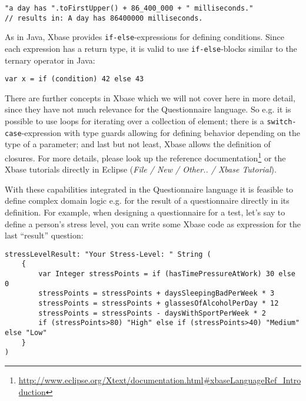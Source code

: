 \begin{lstlisting}[language=Xbase]
"a day has ".toFirstUpper() + 86_400_000 + " milliseconds."
// results in: A day has 86400000 milliseconds.
\end{lstlisting}

As in Java, Xbase provides \texttt{if-else}-expressions for defining conditions. Since each expression
has a return type, it is valid to use  \texttt{if-else}-blocks similar to the ternary operator in Java:

\begin{lstlisting}[language=Xbase]
var x = if (condition) 42 else 43
\end{lstlisting}

There are further concepts in Xbase which we will not cover here in more detail, since they have
not much relevance for the Questionnaire language. So e.g. it is possible to use loops for
iterating over a collection of element; there is a \texttt{switch-case}-expression
with type guards allowing for defining behavior depending on the type of a parameter; and last but
not least, Xbase allows the definition of closures. For more details, please look up the reference
documentation\footnote{\url{http://www.eclipse.org/Xtext/documentation.html\#xbaseLanguageRef\_Introduction}}
or the Xbase tutorials directly in Eclipse (\emph{File / New / Other.. / Xbase Tutorial}). 

With these capabilities integrated in the Questionnaire language it is feasible to define complex
domain logic e.g. for the result of a questionnaire directly in its definition. For example, when
designing a questionnaire for a test, let's say to define a person's stress level, you can write
some Xbase code as expression for the last ``result'' question:

\begin{lstlisting}[language=Xbase]
stressLevelResult: "Your Stress-Level: " String (
	{
		var Integer stressPoints = if (hasTimePressureAtWork) 30 else 0
		stressPoints = stressPoints + daysSleepingBadPerWeek * 3
		stressPoints = stressPoints + glassesOfAlcoholPerDay * 12
		stressPoints = stressPoints - daysWithSportPerWeek * 2
		if (stressPoints>80) "High" else if (stressPoints>40) "Medium" else "Low"
	}
) 
\end{lstlisting}
